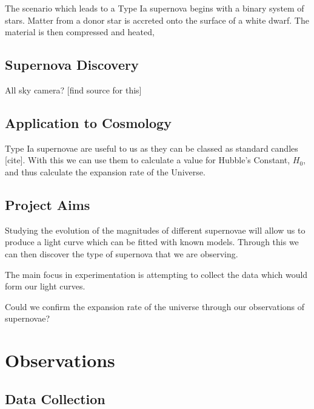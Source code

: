\documentclass[twocolumn]{revtex4}
\begin{document}
The scenario which leads to a Type Ia supernova begins with a binary system of stars. Matter from a donor star is accreted onto the surface of a white dwarf. The material is then compressed and heated,   

\vspace{-3ex}
\subsection{Supernova Discovery}
\vspace{-2ex}

All sky camera? [find source for this]

\vspace{-3ex}
\subsection{Application to Cosmology}
\vspace{-2ex}

Type Ia supernovae are useful to us as they can be classed as standard candles [cite]. With this we can use them to calculate a value for Hubble's Constant, $H_0$, and thus calculate the expansion rate of the Universe.

\vspace{-3ex}
\subsection{Project Aims}
\vspace{-2ex}

Studying the evolution of the magnitudes of different supernovae will allow us to produce a light curve which can be fitted with known models. Through this we can then discover the type of supernova that we are observing. 

The main focus in experimentation is attempting to collect the data which would form our light curves. 

Could we confirm the expansion rate of the universe through our observations of supernovae? 

\vspace{-3ex}
\section{Observations} 
\vspace{-2ex}
\subsection{Data Collection}
\vspace{-2ex}
\end{document}
